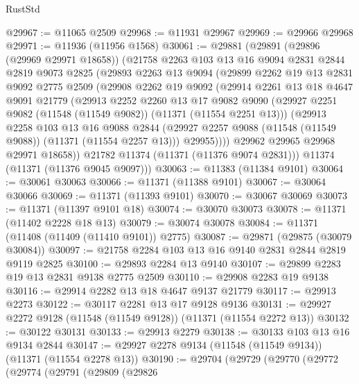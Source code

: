 \begin{lexlean}{RustStd}
\begin{coremodule}
@29967 := @11065 @2509
@29968 := @11931 @29967
@29969 := @29966 @29968
@29971 := @11936 (@11956 @1568)
@30061 := @29881
    (@29891
      (@29896 (@29969 @29971 @18658))
      (@21758
        @2263
        @103
        @13
        @16
        @9094
        @2831
        @2844
        @2819
        @9073
        @2825
        (@29893
          @2263
          @13
          @9094
          (@29899
            @2262
            @19
            @13
            @2831
            @9092
            @2775
            @2509
            (@29908
              @2262
              @19
              @9092
              (@29914
                @2261
                @13
                @18
                @4647
                @9091
                @21779
                (@29913
                  @2252
                  @2260
                  @13
                  @17
                  @9082
                  @9090
                  (@29927 @2251 @9082 (@11548 (@11549 @9082)) (@11371 (@11554 @2251 @13)))
                  (@29913
                    @2258
                    @103
                    @13
                    @16
                    @9088
                    @2844
                    (@29927 @2257 @9088 (@11548 (@11549 @9088)) (@11371 (@11554 @2257 @13)))
                    @29955))))
            @29962
            @29965
            @29968
            @29971
            @18658))
        @21782
        @11374
        (@11371 (@11376 @9074 @2831)))
      @11374
      (@11371 (@11376 @9045 @9097)))
@30063 := @11383 (@11384 @9101)
@30064 := @30061 @30063
@30066 := @11371 (@11388 @9101)
@30067 := @30064 @30066
@30069 := @11371 (@11393 @9101)
@30070 := @30067 @30069
@30073 := @11371 (@11397 @9101 @18)
@30074 := @30070 @30073
@30078 := @11371 (@11402 @2228 @18 @13)
@30079 := @30074 @30078
@30084 := @11371 (@11408 (@11409 (@11410 @9101)) @2775)
@30087 := @29871 (@29875 (@30079 @30084))
@30097 := @21758 @2284 @103 @13 @16 @9140 @2831 @2844 @2819 @9119 @2825
@30100 := @29893 @2284 @13 @9140
@30107 := @29899 @2283 @19 @13 @2831 @9138 @2775 @2509
@30110 := @29908 @2283 @19 @9138
@30116 := @29914 @2282 @13 @18 @4647 @9137 @21779
@30117 := @29913 @2273
@30122 := @30117 @2281 @13 @17 @9128 @9136
@30131 := @29927 @2272 @9128 (@11548 (@11549 @9128)) (@11371 (@11554 @2272 @13))
@30132 := @30122 @30131
@30133 := @29913 @2279
@30138 := @30133 @103 @13 @16 @9134 @2844
@30147 := @29927 @2278 @9134 (@11548 (@11549 @9134)) (@11371 (@11554 @2278 @13))
@30190 := @29704
    (@29729
      (@29770
        (@29772
          (@29774
            (@29791
              (@29809
                (@29826

\end{coremodule}
\end{lexlean}
